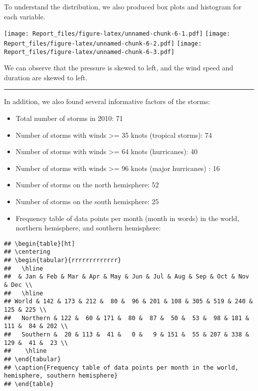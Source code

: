 \documentclass[]{article}
\begin{document}
To understand the distribution, we also produced box plots and histogram
for each variable.

\texttt{[image: Report\_files/figure-latex/unnamed-chunk-6-1.pdf]}
\texttt{[image: Report\_files/figure-latex/unnamed-chunk-6-2.pdf]}
\texttt{[image: Report\_files/figure-latex/unnamed-chunk-6-3.pdf]}

We can observe that the pressure is skewed to left, and the wind speed
and duration are skewed to left.

\begin{center}\rule{0.5\linewidth}{\linethickness}\end{center}

In addition, we also found several informative factors of the storms:

\begin{itemize}
\item
  Total number of storms in 2010: 71
\item
  Number of storms with winds \textgreater{}= 35 knots (tropical
  storms): 74
\item
  Number of storms with winds \textgreater{}= 64 knots (hurricanes): 40
\item
  Number of storms with winds \textgreater{}= 96 knots (major
  hurricanes) : 16
\item
  Number of storms on the north hemisphere: 52
\item
  Number of storms on the south hemisphere: 25
\item
  Frequency table of data points per month (month in words) in the
  world, northern hemisphere, and southern hemisphere:
\end{itemize}

\begin{verbatim}
## \begin{table}[ht]
## \centering
## \begin{tabular}{rrrrrrrrrrrrr}
##   \hline
##  & Jan & Feb & Mar & Apr & May & Jun & Jul & Aug & Sep & Oct & Nov & Dec \\ 
##   \hline
## World & 142 & 173 & 212 &  80 &  96 & 201 & 108 & 305 & 519 & 240 & 125 & 225 \\ 
##   Northern & 122 &  60 & 171 &  80 &  87 &  50 &  53 &  98 & 181 & 111 &  84 & 202 \\ 
##   Southern &  20 & 113 &  41 &   0 &   9 & 151 &  55 & 207 & 338 & 129 &  41 &  23 \\ 
##    \hline
## \end{tabular}
## \caption{Frequency table of data points per month in the world, hemisphere, southern hemisphere} 
## \end{table}
\end{verbatim}
\end{document}

